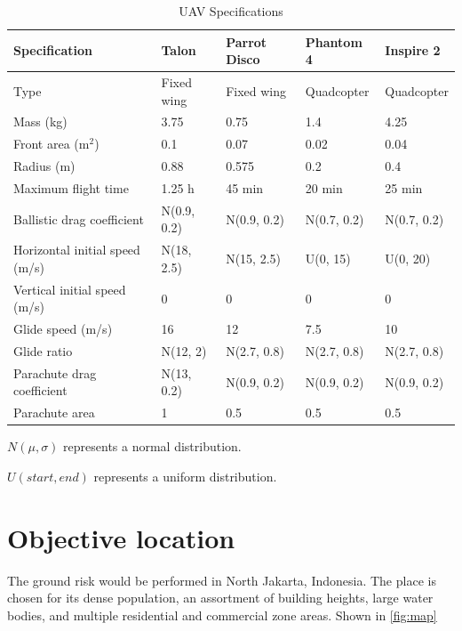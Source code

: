 \documentclass[12pt]{report}
\begin{document}
        \begin{table}[H]
            \centering
            \caption{UAV Specifications}  %
            \begin{tabular}{| l | l | l | l | l |}
                \hline
                \textbf{Specification} & \textbf{Talon} & \textbf{Parrot Disco} & \textbf{Phantom 4} & \textbf{Inspire 2} \\
                \hline
                Type & Fixed wing & Fixed wing & Quadcopter & Quadcopter \\
                Mass (kg) & 3.75 & 0.75 & 1.4 & 4.25 \\
                Front area (m$^2$) & 0.1 & 0.07 & 0.02 & 0.04 \\
                Radius (m) & 0.88 & 0.575 & 0.2 & 0.4 \\
                Maximum flight time & 1.25 h & 45 min & 20 min & 25 min \\
                Ballistic drag coefficient & N(0.9, 0.2) & N(0.9, 0.2) & N(0.7, 0.2) & N(0.7, 0.2) \\
                Horizontal initial speed (m/s) & N(18, 2.5) & N(15, 2.5) & U(0, 15) & U(0, 20) \\
                Vertical initial speed (m/s) & 0 & 0 & 0 & 0 \\
                Glide speed (m/s) & 16 & 12 & 7.5 & 10 \\
                Glide ratio & N(12, 2) & N(2.7, 0.8) & N(2.7, 0.8) & N(2.7, 0.8) \\
                Parachute drag coefficient & N(13, 0.2) & N(0.9, 0.2) & N(0.9, 0.2) & N(0.9, 0.2) \\
                Parachute area & 1 & 0.5 & 0.5 & 0.5 \\
                \hline
            \end{tabular}
            \begin{minipage}{\textwidth}
                \footnotesize
                \(N(\mu, \sigma)\) represents a normal distribution.

                \(U(start, end)\) represents a uniform distribution.
            \end{minipage}
        \end{table}

    \section{Objective location}
        The ground risk would be performed in North Jakarta, Indonesia. The place is chosen for its dense population, an
        assortment of building heights, large water bodies, and multiple residential and commercial zone areas. Shown in \ref{fig:map}
\end{document}
